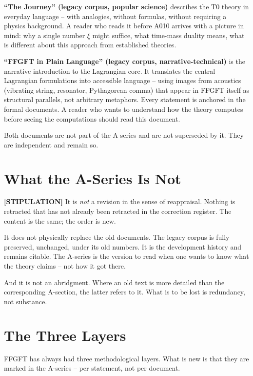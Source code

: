 \textbf{``The Journey'' (legacy corpus, popular science)} describes the T0
theory in everyday language -- with analogies, without formulas, without
requiring a physics background. A reader who reads it before A010 arrives
with a picture in mind: why a single number $\xi$ might suffice, what
time-mass duality means, what is different about this approach from
established theories.

\textbf{``FFGFT in Plain Language'' (legacy corpus, narrative-technical)} is
the narrative introduction to the Lagrangian core. It translates the central
Lagrangian formulations into accessible language -- using images from
acoustics (vibrating string, resonator, Pythagorean comma) that appear in
FFGFT itself as structural parallels, not arbitrary metaphors. Every
statement is anchored in the formal documents. A reader who wants to
understand how the theory computes before seeing the computations should
read this document.

Both documents are not part of the A-series and are not superseded by it.
They are independent and remain so.

\section{What the A-Series Is Not}

\textbf{[STIPULATION]} It is \emph{not} a revision in the sense of
reappraisal. Nothing is retracted that has not already been retracted in the
correction register. The content is the same; the order is new.

It does not physically replace the old documents. The legacy corpus is fully
preserved, unchanged, under its old numbers. It is the development history
and remains citable. The A-series is the version to read when one wants to
know what the theory claims -- not how it got there.

And it is not an abridgment. Where an old text is more detailed than the
corresponding A-section, the latter refers to it. What is to be lost is
redundancy, not substance.

\section{The Three Layers}

FFGFT has always had three methodological layers. What is new is that they
are marked in the A-series -- per statement, not per document.

